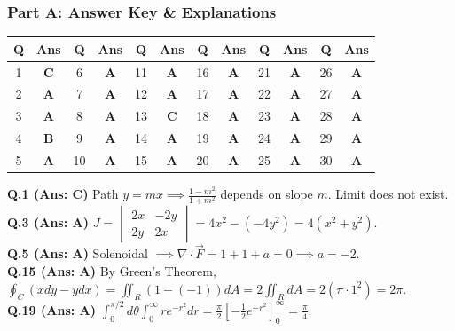 \subsubsection*{Part A: Answer Key \& Explanations}

\begin{center}
\begin{tabular}{|c|c||c|c||c|c||c|c||c|c||c|c|}
\hline
\textbf{Q} & \textbf{Ans} & \textbf{Q} & \textbf{Ans} & \textbf{Q} & \textbf{Ans} & \textbf{Q} & \textbf{Ans} & \textbf{Q} & \textbf{Ans} & \textbf{Q} & \textbf{Ans} \\
\hline
1 & \textbf{C} & 6 & \textbf{A} & 11 & \textbf{A} & 16 & \textbf{A} & 21 & \textbf{A} & 26 & \textbf{A} \\
2 & \textbf{A} & 7 & \textbf{A} & 12 & \textbf{A} & 17 & \textbf{A} & 22 & \textbf{A} & 27 & \textbf{A} \\
3 & \textbf{A} & 8 & \textbf{A} & 13 & \textbf{C} & 18 & \textbf{A} & 23 & \textbf{A} & 28 & \textbf{A} \\
4 & \textbf{B} & 9 & \textbf{A} & 14 & \textbf{A} & 19 & \textbf{A} & 24 & \textbf{A} & 29 & \textbf{A} \\
5 & \textbf{A} & 10 & \textbf{A} & 15 & \textbf{A} & 20 & \textbf{A} & 25 & \textbf{A} & 30 & \textbf{A} \\
\hline
\end{tabular}
\end{center}

\begin{solutionbox}
\textbf{Q.1 (Ans: C)} Path $y = mx \implies \frac{1-m^2}{1+m^2}$ depends on slope $m$. Limit does not exist.\\[1.5mm]
\textbf{Q.3 (Ans: A)} $J = \begin{vmatrix} 2x & -2y \\ 2y & 2x \end{vmatrix} = 4x^2 - (-4y^2) = 4(x^2 + y^2)$.\\[1.5mm]
\textbf{Q.5 (Ans: A)} Solenoidal $\implies \nabla \cdot \vec{F} = 1 + 1 + a = 0 \implies a = -2$.\\[1.5mm]
\textbf{Q.15 (Ans: A)} By Green's Theorem, $\oint_C (x dy - y dx) = \iint_R (1 - (-1)) dA = 2 \iint_R dA = 2(\pi \cdot 1^2) = 2\pi$.\\[1.5mm]
\textbf{Q.19 (Ans: A)} $\int_0^{\pi/2} d\theta \int_0^\infty r e^{-r^2} dr = \frac{\pi}{2} [-\frac{1}{2}e^{-r^2}]_0^\infty = \frac{\pi}{4}$.
\end{solutionbox}

